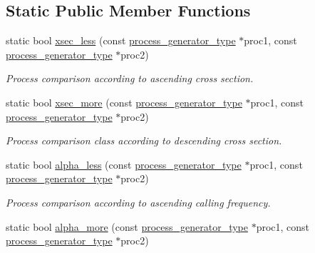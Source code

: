 \subsection*{Static Public Member Functions}
\begin{DoxyCompactItemize}
\item 
\hypertarget{a00210_afcbf494bb9e50dbc2100b19e54cd7be2}{static bool \hyperlink{a00210_afcbf494bb9e50dbc2100b19e54cd7be2}{xsec\-\_\-less} (const \hyperlink{a00430}{process\-\_\-generator\-\_\-type} $\ast$proc1, const \hyperlink{a00430}{process\-\_\-generator\-\_\-type} $\ast$proc2)}\label{a00210_afcbf494bb9e50dbc2100b19e54cd7be2}

\begin{DoxyCompactList}\small\item\em Process comparison according to ascending cross section. \end{DoxyCompactList}\item 
\hypertarget{a00210_a9e312eb4bd2665eca54566290947b298}{static bool \hyperlink{a00210_a9e312eb4bd2665eca54566290947b298}{xsec\-\_\-more} (const \hyperlink{a00430}{process\-\_\-generator\-\_\-type} $\ast$proc1, const \hyperlink{a00430}{process\-\_\-generator\-\_\-type} $\ast$proc2)}\label{a00210_a9e312eb4bd2665eca54566290947b298}

\begin{DoxyCompactList}\small\item\em Process comparison class according to descending cross section. \end{DoxyCompactList}\item 
\hypertarget{a00210_ac02c6724818fc48ded0dfb6a574ac622}{static bool \hyperlink{a00210_ac02c6724818fc48ded0dfb6a574ac622}{alpha\-\_\-less} (const \hyperlink{a00430}{process\-\_\-generator\-\_\-type} $\ast$proc1, const \hyperlink{a00430}{process\-\_\-generator\-\_\-type} $\ast$proc2)}\label{a00210_ac02c6724818fc48ded0dfb6a574ac622}

\begin{DoxyCompactList}\small\item\em Process comparison according to ascending calling frequency. \end{DoxyCompactList}\item 
\hypertarget{a00210_a53a8c44182b72722a3a8713c1815c415}{static bool \hyperlink{a00210_a53a8c44182b72722a3a8713c1815c415}{alpha\-\_\-more} (const \hyperlink{a00430}{process\-\_\-generator\-\_\-type} $\ast$proc1, const \hyperlink{a00430}{process\-\_\-generator\-\_\-type} $\ast$proc2)}\label{a00210_a53a8c44182b72722a3a8713c1815c415}


\end{DoxyCompactItemize}
